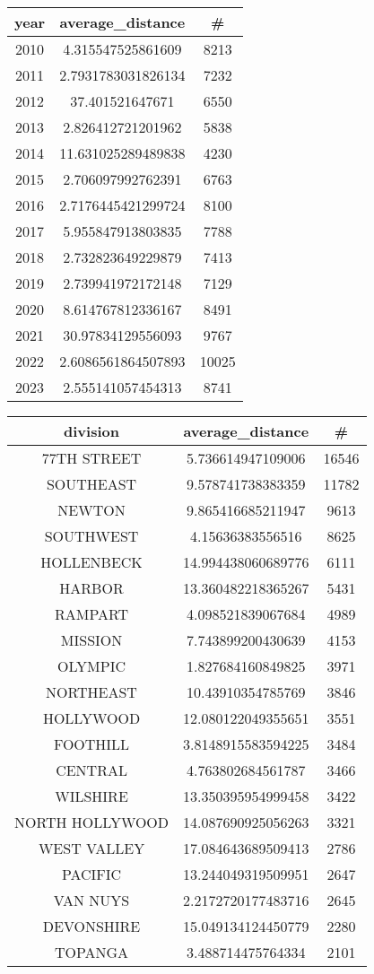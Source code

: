\documentclass{article}
\begin{document}
\begin{center}
\begin{tabular}{|c|c|c|}
\hline
\textbf{year} & \textbf{average\_distance} & \textbf{\#} \\
\hline
2010 & 4.315547525861609 & 8213 \\
2011 & 2.7931783031826134 & 7232 \\
2012 & 37.401521647671 & 6550 \\
2013 & 2.826412721201962 & 5838 \\
2014 & 11.631025289489838 & 4230 \\
2015 & 2.706097992762391 & 6763 \\
2016 & 2.7176445421299724 & 8100 \\
2017 & 5.955847913803835 & 7788 \\
2018 & 2.732823649229879 & 7413 \\
2019 & 2.739941972172148 & 7129 \\
2020 & 8.614767812336167 & 8491 \\
2021 & 30.97834129556093 & 9767 \\
2022 & 2.6086561864507893 & 10025 \\
2023 & 2.555141057454313 & 8741 \\
\hline
\end{tabular}
\quad
\begin{tabular}{|c|c|c|}
\hline
\textbf{division} & \textbf{average\_distance} & \textbf{\#} \\
\hline
77TH STREET & 5.736614947109006 & 16546 \\
SOUTHEAST & 9.578741738383359 & 11782 \\
NEWTON & 9.865416685211947 & 9613 \\
SOUTHWEST & 4.15636383556516 & 8625 \\
HOLLENBECK & 14.994438060689776 & 6111 \\
HARBOR & 13.360482218365267 & 5431 \\
RAMPART & 4.098521839067684 & 4989 \\
MISSION & 7.743899200430639 & 4153 \\
OLYMPIC & 1.827684160849825 & 3971 \\
NORTHEAST & 10.43910354785769 & 3846 \\
HOLLYWOOD & 12.080122049355651 & 3551 \\
FOOTHILL & 3.8148915583594225 & 3484 \\
CENTRAL & 4.763802684561787 & 3466 \\
WILSHIRE & 13.350395954999458 & 3422 \\
NORTH HOLLYWOOD & 14.087690925056263 & 3321 \\
WEST VALLEY & 17.084643689509413 & 2786 \\
PACIFIC & 13.244049319509951 & 2647 \\
VAN NUYS & 2.2172720177483716 & 2645 \\
DEVONSHIRE & 15.049134124450779 & 2280 \\
TOPANGA & 3.488714475764334 & 2101 \\
\hline
\end{tabular}
\end{center}
\end{document}
